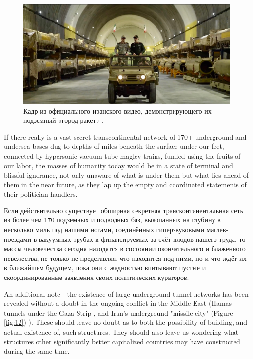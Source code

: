 \documentclass[10pt,twocolumn,letterpaper]{article}
\begin{document}
\begin{figure}[t]
\begin{center}
   \includegraphics[width=1\linewidth]{iran.jpeg}
\end{center}
   \caption{Кадр из официального иранского видео, демонстрирующего их подземный «город ракет» \cite{39,40}.}
\label{fig:12}
\label{fig:onecol}
\end{figure}
If there really is a vast secret transcontinental network of 170+ underground and undersea bases dug to depths of miles beneath the surface under our feet, connected by hypersonic vacuum-tube maglev trains, funded using the fruits of our labor, the masses of humanity today would be in a state of terminal and blissful ignorance, not only unaware of what is under them but what lies ahead of them in the near future, as they lap up the empty and coordinated statements of their politician handlers.

Если действительно существует обширная секретная трансконтинентальная сеть из более чем 170 подземных и подводных баз, выкопанных на глубину в несколько миль под нашими ногами, соединённых гиперзвуковыми маглев-поездами в вакуумных трубах и финансируемых за счёт плодов нашего труда, то массы человечества сегодня находятся в состоянии окончательного и блаженного невежества, не только не представляя, что находится под ними, но и что ждёт их в ближайшем будущем, пока они с жадностью впитывают пустые и скоординированные заявления своих политических кураторов.

An additional note - the existence of large underground tunnel networks has been revealed without a doubt in the ongoing conflict in the Middle East (Hamas tunnels under the Gaza Strip \cite{38}, and Iran's underground "missile city" (Figure \ref{fig:12}) \cite{39,40}). These should leave no doubt as to both the possibility of building, and actual existence of, such structures. They should also leave us wondering what structures other significantly better capitalized countries may have constructed during the same time.
\end{document}
